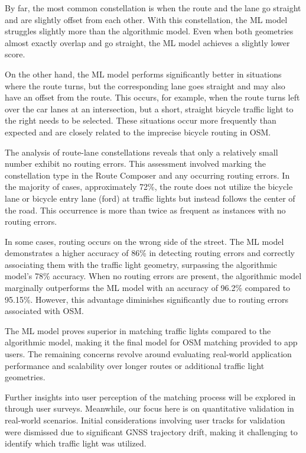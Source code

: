 By far, the most common constellation is when the route and the lane go straight and are slightly offset from each other. With this constellation, the ML model struggles slightly more than the algorithmic model. Even when both geometries almost exactly overlap and go straight, the ML model achieves a slightly lower score.

On the other hand, the ML model performs significantly better in situations where the route turns, but the corresponding lane goes straight and may also have an offset from the route. This occurs, for example, when the route turns left over the car lanes at an intersection, but a short, straight bicycle traffic light to the right needs to be selected. These situations occur more frequently than expected and are closely related to the imprecise bicycle routing in OSM.

The analysis of route-lane constellations reveals that only a relatively small number exhibit no routing errors. This assessment involved marking the constellation type in the Route Composer and any occurring routing errors. In the majority of cases, approximately 72\%, the route does not utilize the bicycle lane or bicycle entry lane (ford) at traffic lights but instead follows the center of the road. This occurrence is more than twice as frequent as instances with no routing errors.

In some cases, routing occurs on the wrong side of the street. The ML model demonstrates a higher accuracy of 86\% in detecting routing errors and correctly associating them with the traffic light geometry, surpassing the algorithmic model's 78\% accuracy. When no routing errors are present, the algorithmic model marginally outperforms the ML model with an accuracy of 96.2\% compared to 95.15\%. However, this advantage diminishes significantly due to routing errors associated with OSM.

The ML model proves superior in matching traffic lights compared to the algorithmic model, making it the final model for OSM matching provided to app users. The remaining concerns revolve around evaluating real-world application performance and scalability over longer routes or additional traffic light geometries.

Further insights into user perception of the matching process will be explored in  through user surveys. Meanwhile, our focus here is on quantitative validation in real-world scenarios. Initial considerations involving user tracks for validation were dismissed due to significant GNSS trajectory drift, making it challenging to identify which traffic light was utilized.

